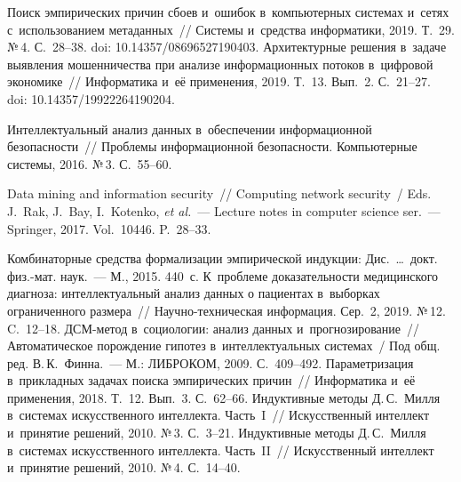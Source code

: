 \begin{multicols}{2}
{\small\frenchspacing
 {%
 \begin{thebibliography}{99}
 Поиск эмпирических 
причин сбоев и~ошибок в~компьютерных системах и~сетях с~использованием метаданных~// 
Системы и~средства информатики, 2019. Т.~29. №\,4. С.~28--38. doi: 10.14357/08696527190403.
 Архитектурные решения 
в~задаче выявления мошенничества при анализе информационных потоков в~цифровой 
экономике~// Информатика и~её применения, 2019. Т.~13. Вып.~2. С.~21--27. doi: 
10.14357/19922264190204.

 Интеллектуальный анализ 
данных в~обеспечении информационной безопасности~// Проб\-ле\-мы информационной 
безопасности. Компьютерные сис\-те\-мы, 2016. №\,3. С.~55--60.

 Data mining and information security~// Computing network security~/
Eds. J.~Rak, J.~Bay, I.~Kotenko, \textit{et al.}~--- Lecture notes in computer science ser.~--- Springer, 
2017. Vol.~10446. P.~28--33.

 Комбинаторные средства формализации эмпирической индукции: Дис.\ 
\ldots\  докт. физ.-мат. наук.~--- М., 2015. 440~с.
 К~проб\-ле\-ме доказательности медицинского 
диагноза: интеллектуальный анализ данных о пациентах в~выборках ограниченного размера~// 
На\-уч\-но-тех\-ни\-че\-ская \mbox{информация}. Сер.~2, 2019. №\,12. C.~12--18.
\bibitem{7-gr}
 ДСМ-метод в~социологии: анализ данных и~прогнозирование~// 
Автоматическое порождение гипотез в~интеллектуальных системах~/ Под общ. ред. 
В.\,К.~Финна.~--- М.: ЛИБРОКОМ, 2009. С.~409--492.
Параметризация в~прикладных задачах поиска эмпирических причин~// Информатика и~её 
применения, 2018. Т.~12. Вып.~3. С.~62--66.
 Индуктивные методы Д.\,С.~Милля в~сис\-те\-мах искусственного интеллекта. 
Часть~I~// Искусственный интеллект и~принятие решений, 2010. №\,3. С.~3--21.
\bibitem{10-gr}
 Индуктивные методы Д.\,С.~Милля в~сис\-те\-мах искусственного интеллекта. 
Часть~II~// Искусственный интеллект и~принятие решений, 2010. №\,4. С.~14--40.
 \end{thebibliography}

 }
 }

\end{multicols}

